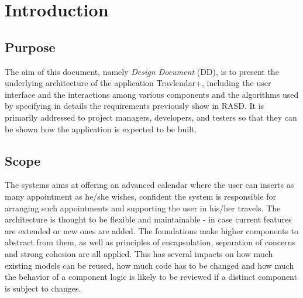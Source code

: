 \chapter{Introduction}
\label{cha:intro}

\section{Purpose}
\label{sec:purpose}
The aim of this document, namely \textit{Design Document} (DD), is to present the underlying architecture of the application Travlendar+, including the user interface and the interactions among various components and the algorithms used by specifying in details the requirements previously show in RASD. It is primarily addressed to project managers, developers, and testers so that they can be shown how the application is expected to be built.

\section{Scope}
\label{sec:scope}
The systems aims at offering an advanced calendar where the user can inserts as many appointment as he/she wishes, confident the system is responsible for arranging such appointments and supporting the user in his/her travels.  The architecture is thought to be flexible and maintainable - in case current features are extended or new ones are added. The  foundations make higher components to abstract from them, as well as principles of encapsulation, separation of concerns and strong cohesion are all applied. This has several impacts on how much existing models can be reused, how much code has to be changed and how much the behavior of a component logic is likely to be reviewed if a distinct component is subject to changes.

